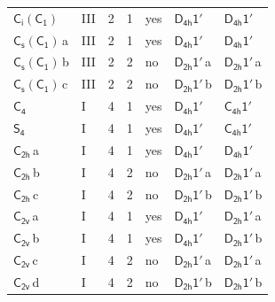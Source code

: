 \documentclass[10pt,a4paper]{article}
\numberwithin{equation}{section}
\newcommand{\grp}[1]{\mathsf{#1}}
\newcommand{\clsletter}[1]{\,{\scriptsize\color{black!55}#1}}
\begin{document}
{\begin{longtable}{@{}llrrlll@{}}
\href{S2-C1.pdf}{$\grp{C_{i}}(\grp{C_{1}})$} & III & 2 & 1 & yes & \href{D4h-1p.pdf}{$\grp{D_{4h}1'}$} & \href{D4h-1p.pdf}{$\grp{D_{4h}1'}$}\\
\href{C1v-C1.pdf}{$\grp{C_{s}}(\grp{C_{1}})$}\clsletter{a} & III & 2 & 1 & yes & \href{D4h-1p.pdf}{$\grp{D_{4h}1'}$} & \href{D4h-1p.pdf}{$\grp{D_{4h}1'}$}\\
\href{C1v-C1.pdf}{$\grp{C_{s}}(\grp{C_{1}})$}\clsletter{b} & III & 2 & 2 & no & \href{D2h-1p.pdf}{$\grp{D_{2h}1'}$}\clsletter{a} & \href{D2h-1p.pdf}{$\grp{D_{2h}1'}$}\clsletter{a}\\
\href{C1v-C1.pdf}{$\grp{C_{s}}(\grp{C_{1}})$}\clsletter{c} & III & 2 & 2 & no & \href{D2h-1p.pdf}{$\grp{D_{2h}1'}$}\clsletter{b} & \href{D2h-1p.pdf}{$\grp{D_{2h}1'}$}\clsletter{b}\\
\href{../../../rotation/data/pdf/C4.pdf}{$\grp{C_{4}}$} & I & 4 & 1 & yes & \href{D4h-1p.pdf}{$\grp{D_{4h}1'}$} & \href{C4h-1p.pdf}{$\grp{C_{4h}1'}$}\\
\href{../../../rotation/data/pdf/S4.pdf}{$\grp{S_{4}}$} & I & 4 & 1 & yes & \href{D4h-1p.pdf}{$\grp{D_{4h}1'}$} & \href{C4h-1p.pdf}{$\grp{C_{4h}1'}$}\\
\href{../../../rotation/data/pdf/C2h.pdf}{$\grp{C_{2h}}$}\clsletter{a} & I & 4 & 1 & yes & \href{D4h-1p.pdf}{$\grp{D_{4h}1'}$} & \href{D4h-1p.pdf}{$\grp{D_{4h}1'}$}\\
\href{../../../rotation/data/pdf/C2h.pdf}{$\grp{C_{2h}}$}\clsletter{b} & I & 4 & 2 & no & \href{D2h-1p.pdf}{$\grp{D_{2h}1'}$}\clsletter{a} & \href{D2h-1p.pdf}{$\grp{D_{2h}1'}$}\clsletter{a}\\
\href{../../../rotation/data/pdf/C2h.pdf}{$\grp{C_{2h}}$}\clsletter{c} & I & 4 & 2 & no & \href{D2h-1p.pdf}{$\grp{D_{2h}1'}$}\clsletter{b} & \href{D2h-1p.pdf}{$\grp{D_{2h}1'}$}\clsletter{b}\\
\href{../../../rotation/data/pdf/C2v.pdf}{$\grp{C_{2v}}$}\clsletter{a} & I & 4 & 1 & yes & \href{D4h-1p.pdf}{$\grp{D_{4h}1'}$} & \href{D2h-1p.pdf}{$\grp{D_{2h}1'}$}\clsletter{a}\\
\href{../../../rotation/data/pdf/C2v.pdf}{$\grp{C_{2v}}$}\clsletter{b} & I & 4 & 1 & yes & \href{D4h-1p.pdf}{$\grp{D_{4h}1'}$} & \href{D2h-1p.pdf}{$\grp{D_{2h}1'}$}\clsletter{b}\\
\href{../../../rotation/data/pdf/C2v.pdf}{$\grp{C_{2v}}$}\clsletter{c} & I & 4 & 2 & no & \href{D2h-1p.pdf}{$\grp{D_{2h}1'}$}\clsletter{a} & \href{D2h-1p.pdf}{$\grp{D_{2h}1'}$}\clsletter{a}\\
\href{../../../rotation/data/pdf/C2v.pdf}{$\grp{C_{2v}}$}\clsletter{d} & I & 4 & 2 & no & \href{D2h-1p.pdf}{$\grp{D_{2h}1'}$}\clsletter{b} & \href{D2h-1p.pdf}{$\grp{D_{2h}1'}$}\clsletter{b}\\

\end{longtable}}
\end{document}
